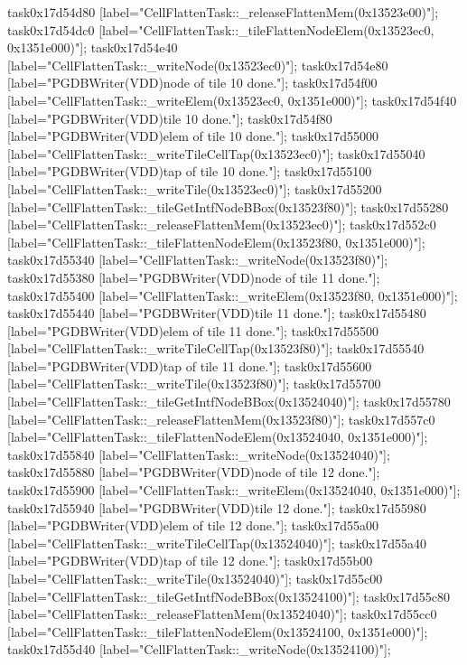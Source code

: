 {	task0x17d54d80 [label="CellFlattenTask::_releaseFlattenMem(0x13523e00)"];
	task0x17d54dc0 [label="CellFlattenTask::_tileFlattenNodeElem(0x13523ec0, 0x1351e000)"];
	task0x17d54e40 [label="CellFlattenTask::_writeNode(0x13523ec0)"];
	task0x17d54e80 [label="PGDBWriter(VDD)\nCell node of tile 10 done."];
	task0x17d54f00 [label="CellFlattenTask::_writeElem(0x13523ec0, 0x1351e000)"];
	task0x17d54f40 [label="PGDBWriter(VDD)\nCell tile 10 done."];
	task0x17d54f80 [label="PGDBWriter(VDD)\nCell elem of tile 10 done."];
	task0x17d55000 [label="CellFlattenTask::_writeTileCellTap(0x13523ec0)"];
	task0x17d55040 [label="PGDBWriter(VDD)\nCell tap of tile 10 done."];
	task0x17d55100 [label="CellFlattenTask::_writeTile(0x13523ec0)"];
	task0x17d55200 [label="CellFlattenTask::_tileGetIntfNodeBBox(0x13523f80)"];
	task0x17d55280 [label="CellFlattenTask::_releaseFlattenMem(0x13523ec0)"];
	task0x17d552c0 [label="CellFlattenTask::_tileFlattenNodeElem(0x13523f80, 0x1351e000)"];
	task0x17d55340 [label="CellFlattenTask::_writeNode(0x13523f80)"];
	task0x17d55380 [label="PGDBWriter(VDD)\nCell node of tile 11 done."];
	task0x17d55400 [label="CellFlattenTask::_writeElem(0x13523f80, 0x1351e000)"];
	task0x17d55440 [label="PGDBWriter(VDD)\nCell tile 11 done."];
	task0x17d55480 [label="PGDBWriter(VDD)\nCell elem of tile 11 done."];
	task0x17d55500 [label="CellFlattenTask::_writeTileCellTap(0x13523f80)"];
	task0x17d55540 [label="PGDBWriter(VDD)\nCell tap of tile 11 done."];
	task0x17d55600 [label="CellFlattenTask::_writeTile(0x13523f80)"];
	task0x17d55700 [label="CellFlattenTask::_tileGetIntfNodeBBox(0x13524040)"];
	task0x17d55780 [label="CellFlattenTask::_releaseFlattenMem(0x13523f80)"];
	task0x17d557c0 [label="CellFlattenTask::_tileFlattenNodeElem(0x13524040, 0x1351e000)"];
	task0x17d55840 [label="CellFlattenTask::_writeNode(0x13524040)"];
	task0x17d55880 [label="PGDBWriter(VDD)\nCell node of tile 12 done."];
	task0x17d55900 [label="CellFlattenTask::_writeElem(0x13524040, 0x1351e000)"];
	task0x17d55940 [label="PGDBWriter(VDD)\nCell tile 12 done."];
	task0x17d55980 [label="PGDBWriter(VDD)\nCell elem of tile 12 done."];
	task0x17d55a00 [label="CellFlattenTask::_writeTileCellTap(0x13524040)"];
	task0x17d55a40 [label="PGDBWriter(VDD)\nCell tap of tile 12 done."];
	task0x17d55b00 [label="CellFlattenTask::_writeTile(0x13524040)"];
	task0x17d55c00 [label="CellFlattenTask::_tileGetIntfNodeBBox(0x13524100)"];
	task0x17d55c80 [label="CellFlattenTask::_releaseFlattenMem(0x13524040)"];
	task0x17d55cc0 [label="CellFlattenTask::_tileFlattenNodeElem(0x13524100, 0x1351e000)"];
	task0x17d55d40 [label="CellFlattenTask::_writeNode(0x13524100)"];
}
